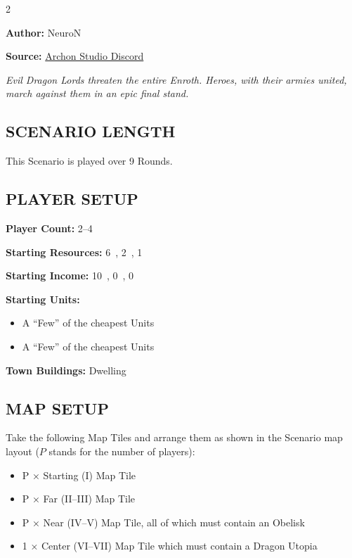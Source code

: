 
\begin{multicols}{2}

\textbf{Author:} NeuroN

\textbf{Source:} \href{https://discord.com/channels/740870068178649108/1332731339614453802/1332731339614453802}{Archon Studio Discord}

\textit{Evil Dragon Lords threaten the entire Enroth. Heroes, with their armies united, march against them in an epic final stand.}  %

\subsection*{\MakeUppercase{Scenario Length}}

This Scenario is played over 9 Rounds.

\subsection*{\MakeUppercase{Player Setup}}

\textbf{Player Count:} 2--4

\textbf{Starting Resources:} 6~, 2~, 1~

\textbf{Starting Income:} 10~, 0~, 0~

\textbf{Starting Units:}
\begin{itemize}
  \item A ``Few'' of the cheapest  Units
  \item A ``Few'' of the cheapest  Units
\end{itemize}

\textbf{Town Buildings:}  Dwelling

\subsection*{\MakeUppercase{Map Setup}}

Take the following Map Tiles and arrange them as shown in the Scenario map layout ($P$ stands for the number of players):

\begin{itemize}
  \item P × Starting (I) Map Tile
  \item P × Far (II--III) Map Tile
  \item P × Near (IV--V) Map Tile, all of which must contain an Obelisk
  \item 1 × Center (VI--VII) Map Tile which must contain a Dragon Utopia
\end{itemize}


\end{multicols}
